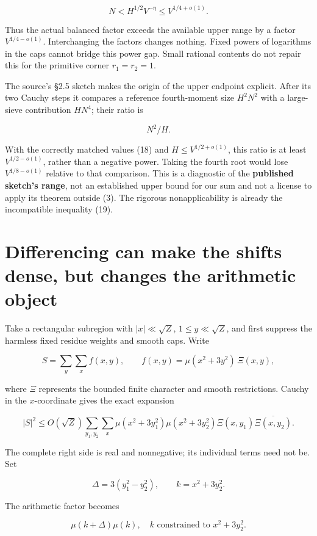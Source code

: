 \[
N<H^{1/2}V^{-\eta}\le V^{1/4+o(1)}.
\tag{19}
\]

Thus the actual balanced factor exceeds the available upper range by a
factor \(V^{1/4-o(1)}\). Interchanging the factors changes nothing.
Fixed powers of logarithms in the caps cannot bridge this power gap.
Small rational contents do not repair this for the primitive corner
\(r_1=r_2=1\).

The source's §2.5 sketch makes the origin of the upper endpoint
explicit. After its two Cauchy steps it compares a reference
fourth-moment size \(H^2N^2\) with a large-sieve contribution \(HN^4\);
their ratio is

\[
N^2/H.
\tag{20}
\]

With the correctly matched values (18) and \(H\le V^{1/2+o(1)}\), this
ratio is at least \(V^{1/2-o(1)}\), rather than a negative power. Taking
the fourth root would lose \(V^{1/8-o(1)}\) relative to that comparison.
This is a diagnostic of the \textbf{published sketch's range}, not an
established upper bound for our sum and not a license to apply its
theorem outside (3). The rigorous nonapplicability is already the
incompatible inequality (19).

\section{Differencing can make the shifts dense, but changes the
arithmetic
object}\label{differencing-can-make-the-shifts-dense-but-changes-the-arithmetic-object}

Take a rectangular subregion with \(|x|\ll\sqrt Z\),
\(1\le y\ll\sqrt Z\), and first suppress the harmless fixed residue
weights and smooth caps. Write

\[
S=\sum_y\sum_x f(x,y),\qquad
f(x,y)=\mu(x^2+3y^2)\,\Xi(x,y),
\]

where \(\Xi\) represents the bounded finite character and smooth
restrictions. Cauchy in the \(x\)-coordinate gives the exact expansion

\[
|S|^2\le O(\sqrt Z)
\sum_{y_1,y_2}\sum_x
\mu(x^2+3y_1^2)\mu(x^2+3y_2^2)
\Xi(x,y_1)\overline{\Xi(x,y_2)}.
\tag{21}
\]

The complete right side is real and nonnegative; its individual terms
need not be. Set

\[
\Delta=3(y_1^2-y_2^2),\qquad k=x^2+3y_2^2.
\]

The arithmetic factor becomes

\[
\mu(k+\Delta)\mu(k),
\quad k\text{ constrained to }x^2+3y_2^2.
\tag{22}
\]

